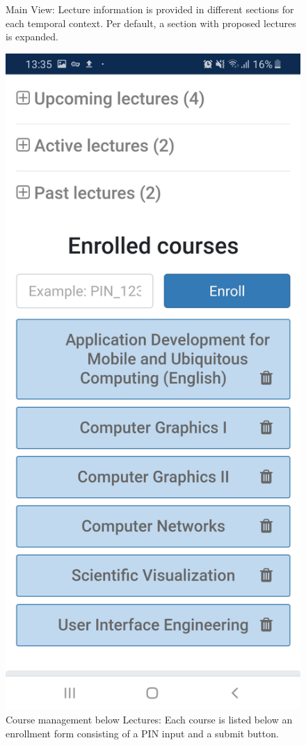\begin{figure}
\begin{minipage}[t]{.5\textwidth}
		\captionsetup{width=.8\linewidth}
		\caption{Main View: Lecture information is provided in different sections for each temporal context. Per default, a section with proposed lectures is expanded.}
		\label{fig:mainview}
	\end{minipage}%
	\begin{minipage}[t]{.5\textwidth}
		\centering
		\includegraphics[width=0.95\linewidth]{screenshots/main_view_course_management.jpg}
		\captionsetup{width=.8\linewidth}
		\caption{Course management below Lectures: Each course is listed below an enrollment form consisting of a PIN input and a submit button.}
		\label{fig:mainviewcoursemanagement}
	\end{minipage}
\end{figure}

